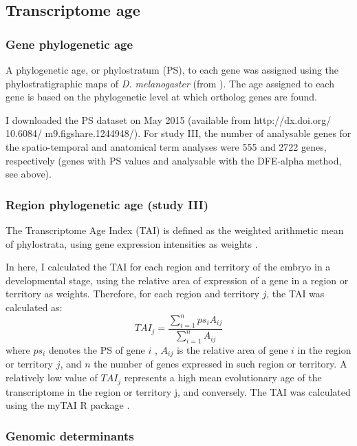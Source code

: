 \subsection{Transcriptome age}

\subsubsection{Gene phylogenetic age}
A phylogenetic age, or phylostratum (PS), to each gene was assigned using the phylostratigraphic maps of \textit{D. melanogaster} (from \citealp{Drost2014,Drost2015}). The age assigned to each gene is based on the phylogenetic level at which ortholog genes are found. 

I downloaded the PS dataset on May 2015 (available from http://dx.doi.org/ 10.6084/ m9.figshare.1244948/). For study III, the number of analysable genes for the spatio-temporal and anatomical term analyses were 555 and 2722 genes, respectively (genes with PS values and analysable with the DFE-alpha method, see above).


\subsubsection{Region phylogenetic age (study III)} 

The Transcriptome Age Index (TAI) is defined as the weighted arithmetic mean of phylostrata, using gene expression intensities as weights \citep{Domazet-Loso2010}.

In here, I calculated the TAI for each region and territory of the embryo in a developmental stage, using the relative area of expression of a gene in a region or territory as weights.
Therefore, for each region and territory $j$, the TAI was calculated as:
%
$$ TAI_{j} = \frac{ \sum_{i=1}^{n} ps_{i}A_{ij} }{ \sum_{i=1}^{n} A_{ij} }$$
%
where $ps_{i}$ denotes the PS of gene $i$ , $A_{ij}$ is the relative area of gene $i$ in the region or territory $j$, and $n$ the number of genes expressed in such region or territory. A relatively low value of $TAI_{j}$ represents a high mean evolutionary age of the transcriptome in the region or territory j, and conversely. The TAI was calculated using the myTAI R package \citep{Drost2014}.

\subsubsection{Genomic determinants}

